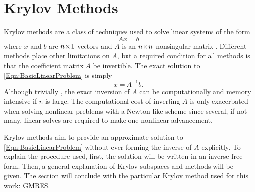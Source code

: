 \documentclass[12pt]{../UWMadThesis}
\begin{document}
\section{Krylov Methods}
Krylov methods are a class of techniques used to solve linear systems of the form
\begin{equation}
    A x = b
    \label{Eqn:BasicLinearProblem}
\end{equation}
where $x$ and $b$ are $n \!\times\! 1$ vectors and $A$ is an $n \!\times\! n$ nonsingular matrix \cite{saad_iterative_2003}.
Different methods place other limitations on $A$, but a required condition for all methods is that the coefficient matrix $A$ be invertible.
The exact solution to \cref{Eqn:BasicLinearProblem} is simply
\begin{equation}
    x = A^{-1} b.
    \label{Eqn:BasicLinearSolution}
\end{equation}
Although trivially , the exact inversion of $A$ can be computationally and memory intensive if $n$ is large.
The computational cost of inverting $A$ is only exacerbated when solving nonlinear problems with a Newton-like scheme since several, if not many, linear solves are required to make one nonlinear advancement.

Krylov methods aim to provide an approximate solution to \cref{Eqn:BasicLinearProblem} without ever forming the inverse of $A$ explicitly.
To explain the procedure used, first, the solution will be written in an inverse-free form.
Then, a general explanation of Krylov subspaces and methods will be given.
The section will conclude with the particular Krylov method used for this work: GMRES.
\end{document}
